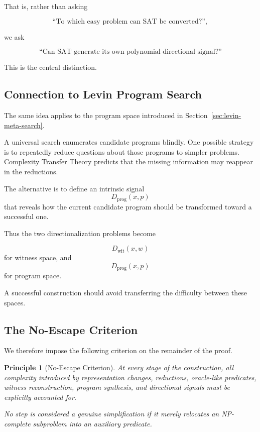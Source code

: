 \documentclass[11pt]{article}
\theoremstyle{plain}
\newtheorem{principle}[theorem]{Principle}
\theoremstyle{definition}
\begin{document}
That is, rather than asking

\[
    \text{``To which easy problem can SAT be converted?''},
\]

we ask

\[
    \boxed{
    \text{``Can SAT generate its own polynomial directional signal?''}
    }
\]

This is the central distinction.

\subsection{Connection to Levin Program Search}

The same idea applies to the program space introduced in
Section~\ref{sec:levin-meta-search}.

A universal search enumerates candidate programs blindly.  One possible
strategy is to repeatedly reduce questions about those programs to simpler
problems.  Complexity Transfer Theory predicts that the missing information
may reappear in the reductions.

The alternative is to define an intrinsic signal
\[
    D_{\mathrm{prog}}(x,p)
\]
that reveals how the current candidate program should be transformed toward a
successful one.

Thus the two directionalization problems become

\[
    D_{\mathrm{wit}}(x,w)
\]
for witness space, and
\[
    D_{\mathrm{prog}}(x,p)
\]
for program space.

A successful construction should avoid transferring the difficulty between
these spaces.

\subsection{The No-Escape Criterion}

We therefore impose the following criterion on the remainder of the proof.

\begin{principle}[No-Escape Criterion]
\label{principle:no-escape}
At every stage of the construction, all complexity introduced by
representation changes, reductions, oracle-like predicates, witness
reconstruction, program synthesis, and directional signals must be explicitly
accounted for.

No step is considered a genuine simplification if it merely relocates an
NP-complete subproblem into an auxiliary predicate.
\end{principle}
\end{document}
